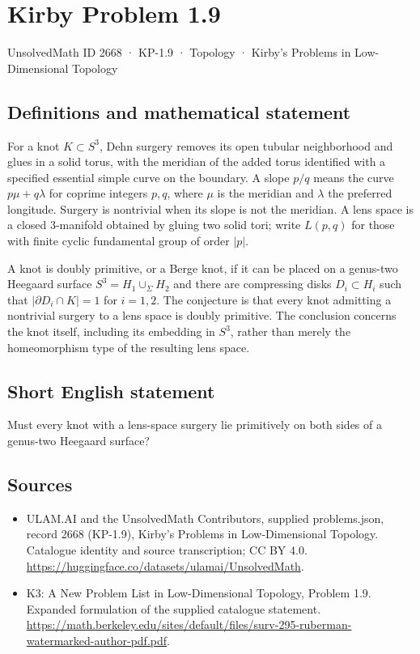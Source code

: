 \documentclass[11pt,a4paper]{article}
\begin{document}
\section*{Kirby Problem 1.9}\label{2668}
{\small UnsolvedMath ID 2668 · KP-1.9 · Topology · Kirby's Problems in Low-Dimensional Topology}
\subsection{Definitions and mathematical statement}
For a knot $K\subset S^3$, Dehn surgery removes its open tubular neighborhood and
glues in a solid torus, with the meridian of the added torus identified with a
specified essential simple curve on the boundary. A slope $p/q$ means the curve
$p\mu+q\lambda$ for coprime integers $p,q$, where $\mu$ is the meridian and
$\lambda$ the preferred longitude. Surgery is nontrivial when its slope is not
the meridian.
A lens space is a closed $3$-manifold obtained by gluing two solid tori; write
$L(p,q)$ for those with finite cyclic fundamental group of order $|p|$.

A knot is doubly primitive, or a Berge knot, if it can be placed on a genus-two
Heegaard surface $S^3=H_1\cup_\Sigma H_2$ and there are compressing disks
$D_i\subset H_i$ such that $|\partial D_i\cap K|=1$ for $i=1,2$.
The conjecture is that every knot admitting a nontrivial surgery to a lens space
is doubly primitive. The conclusion concerns the knot itself, including its
embedding in $S^3$, rather than merely the homeomorphism type of the resulting
lens space.
\subsection{Short English statement}
Must every knot with a lens-space surgery lie primitively on both sides of a genus-two Heegaard surface?
\subsection{Sources}
\begin{itemize}
\item[S1] ULAM.AI and the UnsolvedMath Contributors, supplied problems.json, record 2668 (KP-1.9), Kirby's Problems in Low-Dimensional Topology. Catalogue identity and source transcription; CC BY 4.0.
\url{https://huggingface.co/datasets/ulamai/UnsolvedMath}.
\item[S2] K3: A New Problem List in Low-Dimensional Topology, Problem 1.9. Expanded formulation of the supplied catalogue statement.
\url{https://math.berkeley.edu/sites/default/files/surv-295-ruberman-watermarked-author-pdf.pdf}.
\end{itemize}
\end{document}
